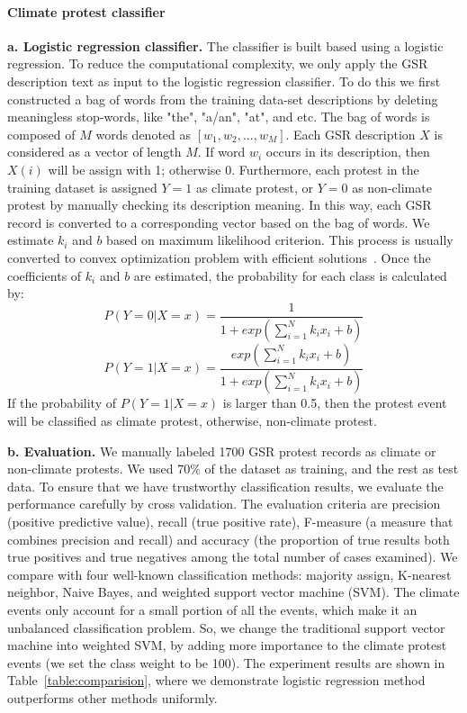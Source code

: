 \documentclass[9pt,twocolumn,twoside]{pnas-new}
\begin{document}
{\paragraph{Climate protest classifier}
\textbf{a. Logistic regression classifier.}
The classifier is built based using a logistic regression.
To reduce the computational complexity, we only apply the GSR description text as input to the logistic regression classifier. To do this we first constructed a bag of words from the training data-set descriptions by deleting meaningless stop-words, like "the", "a/an", "at", and etc. The bag of words is composed of $M$ words denoted as $[w_1, w_2, ..., w_M]$.
Each GSR description $X$ is considered as a vector of length $M$. If word $w_i$ occurs in its description, then $X(i)$ will be assign with 1; otherwise 0. Furthermore, each protest in the training dataset is assigned $Y=1$ as climate protest, or $Y=0$ as non-climate protest by manually checking its description meaning. In this way, each GSR record is converted to a corresponding vector based on the bag of words. We estimate $k_i$ and $b$ based on maximum likelihood criterion. This process is usually converted to convex optimization problem with efficient solutions~\cite{james2013introduction}. Once the coefficients of $k_i$ and $b$ are estimated, the probability for each class is calculated by:
$$P(Y = 0| X=x)= \frac{1}{1+exp( {\sum_{i=1}^{N} k_ix_i}+b)}$$
$$P(Y = 1| X=x)= \frac{exp( {\sum_{i=1}^{N} k_ix_i}+b)}{1+exp( {\sum_{i=1}^{N} k_ix_i}+b)}$$
If the probability of $P(Y = 1| X=x)$ is larger than 0.5, then the protest event will be classified as climate protest, otherwise, non-climate protest.

\textbf{b. Evaluation.}
We manually labeled 1700 GSR protest records as climate or non-climate protests. We used 70\% of the dataset as training, and the rest as test data. To ensure that we have trustworthy classification results, we evaluate the performance carefully by cross validation. The evaluation criteria are precision (positive predictive value), recall (true positive rate), F-measure (a measure that combines precision and recall) and accuracy (the proportion of true results both true positives and true negatives among the total number of cases examined). We compare with four well-known classification methods: majority assign, K-nearest neighbor, Naive Bayes, and weighted support vector machine (SVM). The climate events only account for a small portion of all the events, which make it an unbalanced classification problem. So, we change the traditional support vector machine into weighted SVM, by adding more importance to the climate protest events (we set the class weight to be 100). The experiment results are shown in Table~\ref{table:comparision}, where we demonstrate logistic regression method outperforms other methods uniformly.

}
\end{document}
